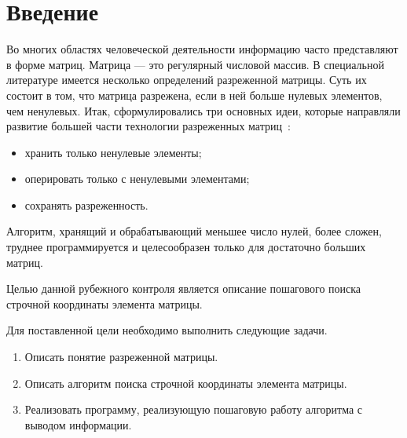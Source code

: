 \chapter*{Введение}

Во многих областях человеческой деятельности информацию часто представляют в форме матриц.
Матрица --- это регулярный числовой массив. 
В специальной литературе имеется несколько определений разреженной матрицы. 
Суть их состоит в том, что матрица разрежена, если в ней больше нулевых элементов, чем ненулевых.
Итак, сформулировались три основных идеи, которые направляли развитие большей части технологии разреженных
матриц~\cite{csr}: 
\begin{itemize}
	\item хранить только ненулевые элементы;
	\item оперировать только с ненулевыми элементами;
	\item сохранять разреженность.
\end{itemize}

Алгоритм, хранящий и обрабатывающий меньшее число нулей, более сложен, труднее программируется и целесообразен только для достаточно больших матриц.

Целью данной рубежного контроля является описание пошагового поиска строчной координаты элемента матрицы.

Для поставленной цели необходимо выполнить следующие задачи.
\begin{enumerate}
	\item Описать понятие разреженной матрицы.
	\item Описать алгоритм поиска строчной координаты элемента матрицы.
	\item Реализовать программу, реализующую пошаговую работу алгоритма с выводом информации.
\end{enumerate}